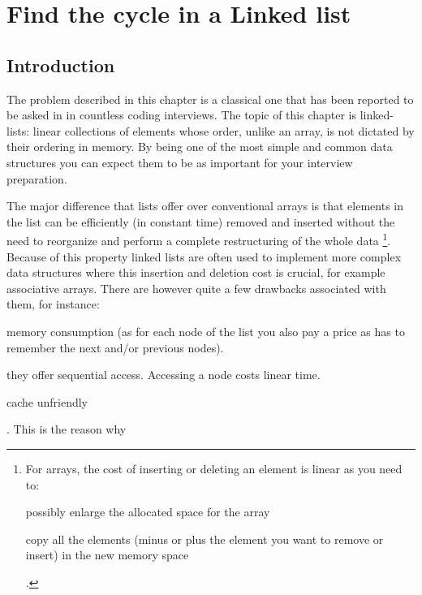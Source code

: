 %

\chapter{Find the cycle in a Linked list}
\label{ch:cycle_in_list}
\section*{Introduction}
The problem described in this chapter is a classical one that has been reported to be asked in 
in countless coding interviews. The topic of this chapter is linked-lists: linear collections of elements whose order, unlike an array,
is not dictated by their ordering in memory. 
By being one of the most simple and common data structures you can expect them to be as important for your interview preparation.

The major difference that lists offer over conventional arrays is that elements in the list can be efficiently  (in constant time) 
removed and inserted without the need to reorganize and perform a complete restructuring of the whole data \footnote{For arrays, the cost of inserting or deleting an element is linear as you need to:
\begin{enumerate*}
	\item possibly enlarge the allocated space for the array
	\item copy all the elements (minus or plus the element you want to remove or insert) in the new memory space
\end{enumerate*}.
}. Because of this property linked lists are often used to implement more complex data structures 
where this insertion and deletion cost is crucial, for example associative arrays.
There are however quite a few drawbacks associated with them, for instance:
\begin{enumerate*}
	\item memory consumption (as for each node of the list you also pay a price as has to remember the next and/or previous nodes).
	\item they offer sequential access. Accessing a node costs linear time.
	\item cache unfriendly
\end{enumerate*}. This is the reason why  

